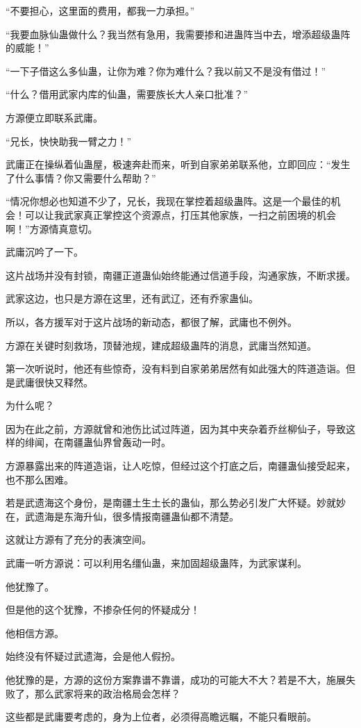 \begin{this_body}
“不要担心，这里面的费用，都我一力承担。”

“我要血脉仙蛊做什么？我当然有急用，我需要掺和进蛊阵当中去，增添超级蛊阵的威能！”

“一下子借这么多仙蛊，让你为难？你为难什么？我以前又不是没有借过！”

“什么？借用武家内库的仙蛊，需要族长大人亲口批准？”

方源便立即联系武庸。

“兄长，快快助我一臂之力！”

武庸正在操纵着仙蛊屋，极速奔赴而来，听到自家弟弟联系他，立即回应：“发生了什么事情？你又需要什么帮助？”

“情况你想必也知道不少了，兄长，我现在掌控着超级蛊阵。这是一个最佳的机会！可以让我武家真正掌控这个资源点，打压其他家族，一扫之前困境的机会啊！”方源情真意切。

武庸沉吟了一下。

这片战场并没有封锁，南疆正道蛊仙始终能通过信道手段，沟通家族，不断求援。

武家这边，也只是方源在这里，还有武辽，还有乔家蛊仙。

所以，各方援军对于这片战场的新动态，都很了解，武庸也不例外。

方源在关键时刻救场，顶替池规，建成超级蛊阵的消息，武庸当然知道。

第一次听说时，他还有些惊奇，没有料到自家弟弟居然有如此强大的阵道造诣。但是武庸很快又释然。

为什么呢？

因为在此之前，方源就曾和池伤比试过阵道，因为其中夹杂着乔丝柳仙子，导致这样的绯闻，在南疆蛊仙界曾轰动一时。

方源暴露出来的阵道造诣，让人吃惊，但经过这个打底之后，南疆蛊仙接受起来，也不那么困难。

若是武遗海这个身份，是南疆土生土长的蛊仙，那么势必引发广大怀疑。妙就妙在，武遗海是东海升仙，很多情报南疆蛊仙都不清楚。

这就让方源有了充分的表演空间。

武庸一听方源说：可以利用名缰仙蛊，来加固超级蛊阵，为武家谋利。

他犹豫了。

但是他的这个犹豫，不掺杂任何的怀疑成分！

他相信方源。

始终没有怀疑过武遗海，会是他人假扮。

他犹豫的是，方源的这份方案靠谱不靠谱，成功的可能大不大？若是不大，施展失败了，那么武家将来的政治格局会怎样？

这些都是武庸要考虑的，身为上位者，必须得高瞻远瞩，不能只看眼前。

\end{this_body}

